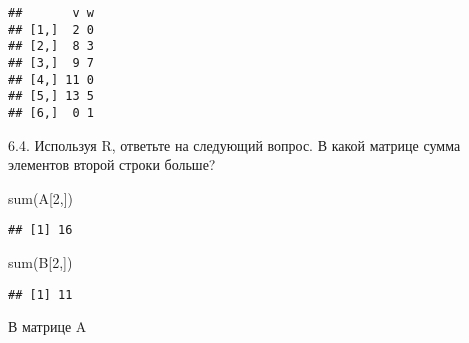\documentclass[
]{article}
\newenvironment{Shaded}{\begin{snugshade}}{\end{snugshade}}
\newcommand{\DecValTok}[1]{\textcolor[rgb]{0.00,0.00,0.81}{#1}}
\newcommand{\FunctionTok}[1]{\textcolor[rgb]{0.00,0.00,0.00}{#1}}
\newcommand{\NormalTok}[1]{#1}
\begin{document}
\begin{verbatim}
##       v w
## [1,]  2 0
## [2,]  8 3
## [3,]  9 7
## [4,] 11 0
## [5,] 13 5
## [6,]  0 1
\end{verbatim}

6.4. Используя R, ответьте на следующий вопрос. В какой матрице сумма
элементов второй строки больше?

\begin{Shaded}
\begin{Highlighting}[]
\FunctionTok{sum}\NormalTok{(A[}\DecValTok{2}\NormalTok{,])}
\end{Highlighting}
\end{Shaded}

\begin{verbatim}
## [1] 16
\end{verbatim}

\begin{Shaded}
\begin{Highlighting}[]
\FunctionTok{sum}\NormalTok{(B[}\DecValTok{2}\NormalTok{,])}
\end{Highlighting}
\end{Shaded}

\begin{verbatim}
## [1] 11
\end{verbatim}

В матрице A
\end{document}

